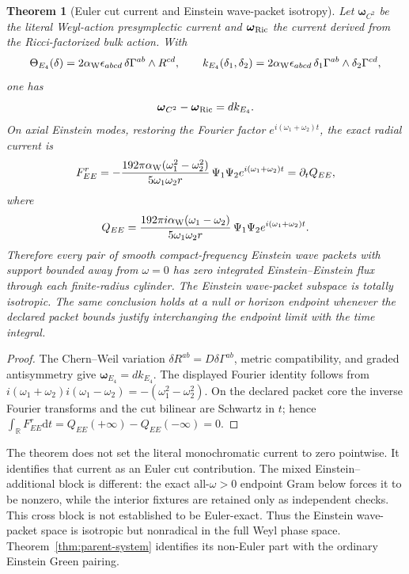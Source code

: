 \documentclass[11pt]{article}
\newtheorem{theorem}{Theorem}[section]
\theoremstyle{definition}
\theoremstyle{remark}
\newcommand{\dd}{\mathrm d}
\begin{document}
\begin{theorem}[Euler cut current and Einstein wave-packet isotropy]
\label{thm:euler-cut}
Let \(\boldsymbol\omega_{C^2}\) be the literal Weyl-action presymplectic
current and \(\boldsymbol\omega_{\rm Ric}\) the current derived from the
Ricci-factorized bulk action.  With
\[
\Theta_{E_4}(\delta)
=
2\alpha_{\rm W}\epsilon_{abcd}\,
\delta\Gamma^{ab}\wedge R^{cd},
\qquad
k_{E_4}(\delta_1,\delta_2)
=
2\alpha_{\rm W}\epsilon_{abcd}\,
\delta_1\Gamma^{ab}\wedge\delta_2\Gamma^{cd},
\]
one has
\[
\boldsymbol\omega_{C^2}-\boldsymbol\omega_{\rm Ric}
=d k_{E_4}.
\]
On axial Einstein modes, restoring the Fourier factor
\(e^{i(\omega_1+\omega_2)t}\), the exact radial current is
\[
F^r_{EE}
=-\frac{192\pi\alpha_{\rm W}(\omega_1^2-\omega_2^2)}
{5\omega_1\omega_2r}\,
\Psi_1\Psi_2e^{i(\omega_1+\omega_2)t}
=\partial_tQ_{EE},
\]
where
\[
Q_{EE}
=
\frac{192\pi i\alpha_{\rm W}(\omega_1-\omega_2)}
{5\omega_1\omega_2r}\,
\Psi_1\Psi_2e^{i(\omega_1+\omega_2)t}.
\]
Therefore every pair of smooth compact-frequency Einstein wave packets with
support bounded away from \(\omega=0\) has zero integrated
Einstein--Einstein flux through each finite-radius cylinder.  The Einstein
wave-packet subspace is totally isotropic.  The same conclusion holds at a
null or horizon endpoint whenever the declared packet bounds justify
interchanging the endpoint limit with the time integral.
\end{theorem}

\begin{proof}
The Chern--Weil variation
\(\delta R^{ab}=D\delta\Gamma^{ab}\), metric compatibility, and graded
antisymmetry give
\(\boldsymbol\omega_{E_4}=dk_{E_4}\).  The displayed Fourier identity follows
from
\(i(\omega_1+\omega_2)i(\omega_1-\omega_2)
=-(\omega_1^2-\omega_2^2)\).
On the declared packet core the inverse Fourier transforms and the cut
bilinear are Schwartz in \(t\); hence
\(\int_{\mathbb R}F^r_{EE}\dd t=Q_{EE}(+\infty)-Q_{EE}(-\infty)=0\).
\end{proof}

The theorem does not set the literal monochromatic current to zero
pointwise.  It identifies that current as an Euler cut contribution.  The
mixed Einstein--additional block is different: the exact all-\(\omega>0\)
endpoint Gram below forces it to be nonzero, while the interior fixtures are
retained only as independent checks.  This cross block is not established to
be Euler-exact.  Thus the Einstein wave-packet space is isotropic but
nonradical in the full Weyl phase space.  Theorem~\ref{thm:parent-system}
identifies its non-Euler part with the ordinary Einstein Green pairing.
\end{document}
